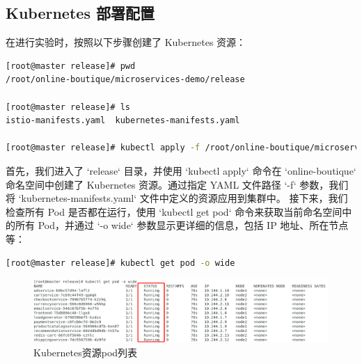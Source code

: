 \subsection{Kubernetes 部署配置}
在进行实验时，按照以下步骤创建了 Kubernetes 资源：
\begin{lstlisting}[language=bash]
[root@master release]# pwd
/root/online-boutique/microservices-demo/release

[root@master release]# ls
istio-manifests.yaml  kubernetes-manifests.yaml

[root@master release]# kubectl apply -f /root/online-boutique/microservices-demo/release/kubernetes-manifests.yaml -n online-boutique
\end{lstlisting}
首先，我们进入了 `release` 目录，并使用 `kubectl apply` 命令在 `online-boutique` 命名空间中创建了 Kubernetes 资源。通过指定 YAML 文件路径 `-f` 参数，我们将 `kubernetes-manifests.yaml` 文件中定义的资源应用到集群中。
接下来，我们检查所有 Pod 是否都在运行，使用 `kubectl get pod` 命令来获取当前命名空间中的所有 Pod，并通过 `-o wide` 参数显示更详细的信息，包括 IP 地址、所在节点等：
\begin{lstlisting}[language=bash]
	[root@master release]# kubectl get pod -o wide
\end{lstlisting}
\begin{figure}[htb]
	\centering
	\includegraphics[width=1\textwidth]{figures/chapter2/nodes.png}
	\caption{Kubernetes资源pod列表}
	\label{fig:2-Kubernetes资源pod列表}
\end{figure}

